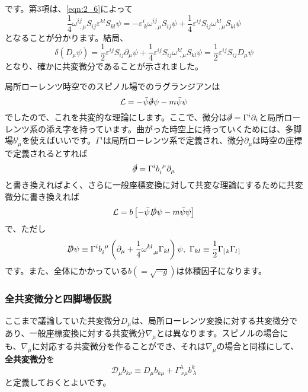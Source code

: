 \documentclass[unicode,a4paper,11pt]{ltjsarticle}
\begin{document}
です。第3項は、\eqref{eqn:2_6}によって
\begin{equation}
   \frac{1}{4}\omega^{ij}_{\ \ ,\mu}S_{ij}\varepsilon^{kl}S_{kl}\psi
   =
   -
   \varepsilon^{i}_{\ k}\omega^{ij}_{\ \ ,\mu}
   S_{ij}\psi
   +
   \frac{1}{4}\varepsilon^{ij}S_{ij}\omega^{kl}_{\ \ ,\mu}S_{kl}\psi
   \label{eqn:2_7}
\end{equation}
となることが分かります。結局、
\begin{equation}
   \delta(D_{\mu}\psi)
   =
   \frac{1}{2}\varepsilon^{ij}S_{ij}\partial_{\mu}\psi
   +
   \frac{1}{4}\varepsilon^{ij}S_{ij}\omega^{kl}_{\ \ ,\mu}S_{kl}\psi
   =
   \frac{1}{2}\varepsilon^{ij}S_{ij}D_{\mu}\psi
\end{equation}
となり、確かに共変微分であることが示されました。

局所ローレンツ時空でのスピノル場でのラグランジアンは
\begin{equation}
   \mathcal{L}
   =
   -
   \bar{\psi}\slashed{\partial}\psi
   -
   m\bar{\psi}\psi
\end{equation}
でしたので、これを共変的な理論にします。ここで、微分は$\slashed
   {\partial}=\Gamma^{i}\partial_{i}$と局所ローレンツ系の添え字を持っています。曲がった時空上に持っていくためには、多脚場$b^{i}_{\ \mu}$を使えばいいです。$\Gamma^{i}$は局所ローレンツ系で定義され、微分$\partial_{\mu}$は時空の座標で定義されるとすれば
\begin{equation}
   \slashed{\partial}
   =
   \Gamma^{i}b^{\ \mu}_{i}\partial_{\mu}
\end{equation}
と書き換えればよく、さらに一般座標変換に対して共変な理論にするために共変微分に書き換えれば
\begin{equation}
   \mathcal{L}
   =
   b
   \left[
      -\bar{\psi}\slashed{D}\psi
      -m\bar{\psi}\psi
      \right]
\end{equation}
で、ただし
\begin{equation}
   \slashed{D}\psi
   \equiv
   \Gamma^{i}b^{\ \mu}_{i}
   \left(
   \partial_{\mu}+\frac{1}{4}\omega^{kl}_{\ \ ,\mu}\Gamma_{kl}
   \right)
   \psi
   ,\
   \Gamma_{kl}
   \equiv
   \frac{1}{2}\Gamma_{\left[\right.k}\Gamma_{l\left.\right]}
\end{equation}
です。また、全体にかかっている$b(=\sqrt{-g})$は体積因子になります。


\subsubsection*{全共変微分と四脚場仮説}

ここまで議論していた共変微分$D_{\mu}$は、局所ローレンツ変換に対する共変微分であり、一般座標変換に対する共変微分$\nabla_{\mu}$とは異なります。スピノルの場合にも、$\nabla_{\mu}$に対応する共変微分を作ることができ、それは$\nabla_{\mu}$の場合と同様にして、\textbf{全共変微分}を
\begin{equation}
   \mathcal{D}_{\mu}
   b_{k\nu}
   \equiv
   D_{\mu}b_{k\mu}
   +
   \Gamma^{\lambda}_{\ \nu\mu} b^{k}_{\ \lambda}
\end{equation}
と定義しておくとよいです。
\end{document}
